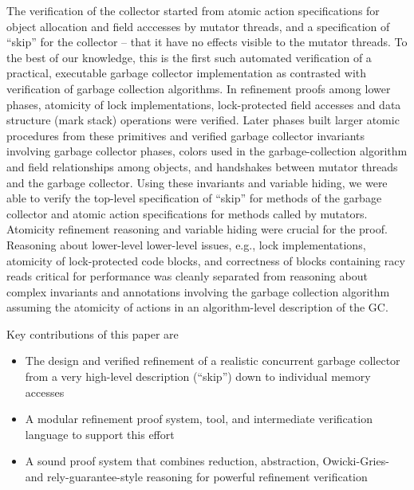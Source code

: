 The verification of the collector started from atomic action specifications for object allocation and field acccesses by mutator threads, and a specification of ``skip'' for the collector -- that it have no effects visible to the mutator threads. 
To the best of our knowledge, this is the first such automated verification of a practical, executable garbage collector implementation as contrasted with verification of garbage collection algorithms. 
In refinement proofs among lower phases, atomicity of lock implementations, lock-protected field accesses and data structure (mark stack) operations were verified. 
Later phases built larger atomic procedures from these primitives and verified garbage collector invariants involving garbage collector phases, colors used in the garbage-collection algorithm and field relationships among objects, and handshakes between mutator threads and the garbage collector. 
Using these invariants and variable hiding, we were able to verify the top-level specification of  ``skip'' for methods of the garbage collector and atomic action specifications for methods called by mutators. 
Atomicity refinement reasoning and variable hiding were crucial for the proof. 
Reasoning about lower-level lower-level issues, e.g., lock implementations, atomicity of lock-protected code blocks, and correctness of blocks containing racy reads critical for performance was cleanly separated from reasoning about complex invariants and annotations involving the garbage collection algorithm assuming the atomicity of actions in an algorithm-level description of the GC.

Key contributions of this paper are 
\begin{itemize}
\item The design and verified refinement of a realistic concurrent garbage collector from a very high-level description (``skip'') down to individual memory accesses
\item A modular refinement proof system, tool, and intermediate verification language to support this effort
\item A sound proof system that combines reduction, abstraction, Owicki-Gries- and rely-guarantee-style reasoning for powerful refinement verification
\end{itemize}


